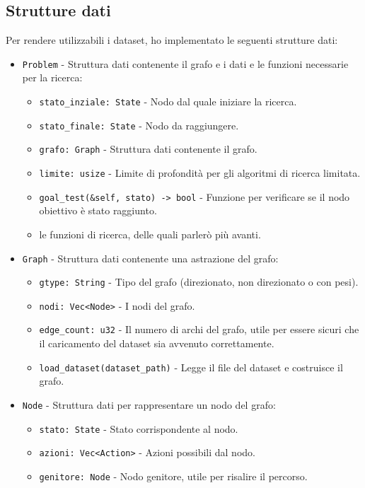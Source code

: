 \documentclass{ol-softwaremanual}
\begin{document}
\subsection{Strutture dati}
Per rendere utilizzabili i dataset, ho implementato le seguenti strutture dati:
\begin{itemize}
	\item \texttt{Problem} - Struttura dati contenente il grafo e i dati e le funzioni necessarie per la ricerca:
	      \begin{itemize}
		      \item \texttt{stato\_inziale: State} - Nodo dal quale iniziare la ricerca.
		      \item \texttt{stato\_finale: State} - Nodo da raggiungere.
		      \item \texttt{grafo: Graph} - Struttura dati contenente il grafo.
		      \item \texttt{limite: usize} - Limite di profondità per gli algoritmi di ricerca limitata.
		      \item \texttt{goal\_test(\&self, stato) -> bool} - Funzione per verificare se il nodo obiettivo è stato raggiunto.
		      \item le funzioni di ricerca, delle quali parlerò più avanti.
	      \end{itemize}
	\item \texttt{Graph} - Struttura dati contenente una astrazione del grafo:
	      \begin{itemize}
		      \item \texttt{gtype: String} - Tipo del grafo (direzionato, non direzionato o con pesi).
		      \item \texttt{nodi: Vec<Node>} - I nodi del grafo.
		      \item \texttt{edge\_count: u32} - Il numero di archi del grafo, utile per essere sicuri che il caricamento del dataset sia avvenuto correttamente.
		      \item \texttt{load\_dataset(dataset\_path)} - Legge il file del dataset e costruisce il grafo.
	      \end{itemize}
	\item \texttt{Node} - Struttura dati per rappresentare un nodo del grafo:
	      \begin{itemize}
		      \item \texttt{stato: State} - Stato corrispondente al nodo.
		      \item \texttt{azioni: Vec<Action>} - Azioni possibili dal nodo.
		      \item \texttt{genitore: Node} - Nodo genitore, utile per risalire il percorso.

\end{itemize}
\end{itemize}
\end{document}
